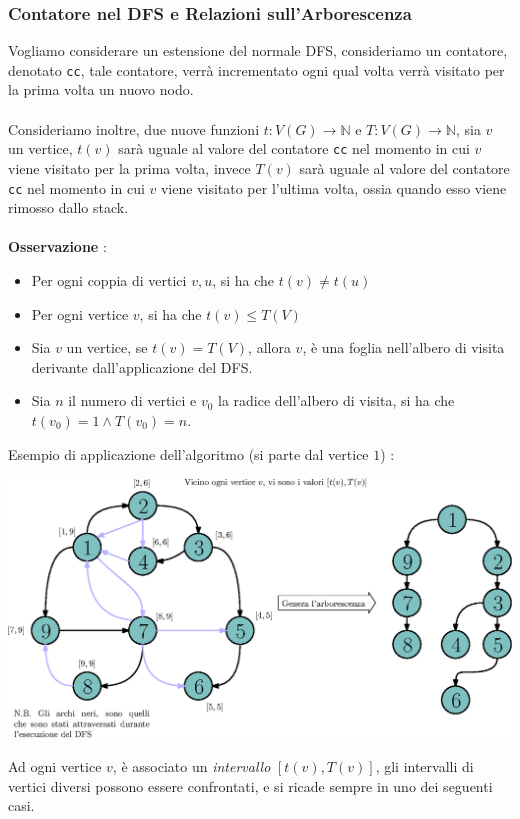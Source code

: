 \documentclass[12pt, letterpaper]{article}
\newcommand{\code}[1]{\colorbox{light-gray}{\texttt{#1}}}
\newcommand{\acc}{\\\hphantom{}\\}
\begin{document}
\subsubsection{Contatore nel DFS e Relazioni sull'Arborescenza}
Vogliamo considerare un estensione del normale DFS, consideriamo un contatore, denotato \code{cc}, tale contatore, 
verrà incrementato ogni qual volta verrà visitato per la prima volta un nuovo nodo.\acc Consideriamo inoltre, due nuove 
funzioni \(t:V(G)\rightarrow\mathbb{N}\) e \(T:V(G)\rightarrow\mathbb{N}\), sia \(v\) un vertice, \(t(v)\) sarà uguale al valore 
del contatore \code{cc} nel momento in cui \(v\) viene visitato per la prima volta, invece \(T(v)\) sarà uguale al valore 
del contatore \code{cc} nel momento in cui \(v\) viene visitato per l'ultima volta, ossia quando esso viene rimosso dallo stack.\acc 
\textbf{Osservazione} : \begin{itemize}
    \item Per ogni coppia di vertici \(v,u\), si ha che \(t(v)\ne t(u)\)
    \item Per ogni vertice \(v\), si ha che \(t(v)\le T(V)\)
    \item Sia \(v\) un vertice, se \(t(v)=T(V)\), allora \(v\), è una foglia nell'albero di visita derivante dall'applicazione 
    del DFS.
    \item Sia \(n\) il numero di vertici e \(v_0\) la radice dell'albero di visita, si ha che \(t(v_0)=1\land T(v_0)=n\).
\end{itemize}
Esempio di applicazione dell'algoritmo (si parte dal vertice \(1\)) : \begin{center}
    \includegraphics[width=1.05\textwidth ]{images/dfsContatore.eps}
    \end{center}
Ad ogni vertice \(v\), è associato un \textit{intervallo} \([t(v),T(v)]\), gli intervalli di vertici diversi possono 
essere confrontati, e si ricade sempre in uno dei seguenti casi.\acc 
\end{document}

